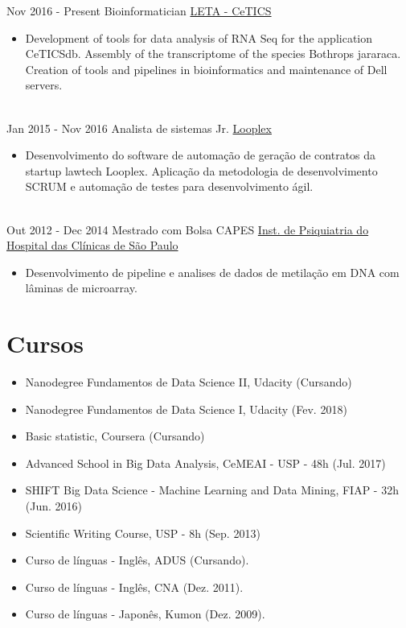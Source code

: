 \documentclass[letterpaper]{twentysecondcv} %
\begin{document}
\begin{twenty} %
\twentyitem
    	{Nov 2016 - }
		{Present}
        {Bioinformatician}
        {\href{http://cetics.butantan.gov.br/}{LETA - CeTICS}}
        {}
        {\begin{itemize}
        \item Development of tools for data analysis of RNA Seq for the application CeTICSdb. Assembly of the transcriptome of the species Bothrops jararaca. Creation of tools and pipelines in bioinformatics and maintenance of Dell servers.
        \end{itemize}}
        \\
	\twentyitem
    	{Jan 2015 - }
		{Nov 2016}
        {Analista de sistemas Jr.}
        {\href{www.looplex.com.br/}{Looplex}}
        {}
        {
        {\begin{itemize}
        \item Desenvolvimento do software de automação de geração de contratos da startup lawtech Looplex. Aplicação da metodologia de desenvolvimento SCRUM e automação de testes para desenvolvimento ágil.
    \end{itemize}}
        }
    \\   
    \twentyitem
   		{Out 2012 - }
		{Dec 2014}
        {Mestrado com Bolsa CAPES }
        {\href{www.ipqhc.org.br}{ Inst. de Psiquiatria do Hospital das Clínicas de São Paulo}}
        {}
        {
        {\begin{itemize}
        \item Desenvolvimento de pipeline e analises de dados de metilação em DNA com lâminas de microarray.
    \end{itemize}}
        }       
\end{twenty}

\section{Cursos}
\begin{itemize}
	\item Nanodegree Fundamentos de Data Science II, Udacity (Cursando)
	\item Nanodegree Fundamentos de Data Science I, Udacity (Fev. 2018)
	\item Basic statistic, Coursera (Cursando)
	\item Advanced School in Big Data Analysis, CeMEAI - USP - 48h (Jul. 2017)
	\item SHIFT Big Data Science - Machine Learning and Data Mining, FIAP - 32h (Jun. 2016)
	\item Scientific Writing Course, USP - 8h (Sep. 2013)
	\item Curso de línguas - Inglês, ADUS (Cursando).
	\item Curso de línguas - Inglês, CNA (Dez. 2011).
	\item Curso de línguas - Japonês, Kumon (Dez. 2009).
\end{itemize}
\end{document}
